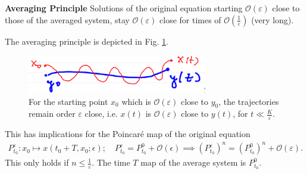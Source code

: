 \begin{framed}
	\noindent
	\textbf{Averaging Principle} Solutions of the original equation starting $\mathcal{O}(\varepsilon)$ close to those of the averaged system, stay $\mathcal{O}(\varepsilon)$ close for times of $\mathcal{O}\left(\frac{1}{\varepsilon}\right)$ (very long).
\end{framed}

The averaging principle is depicted in Fig. \ref{fig:avg_principle}.
\begin{figure}[h!]
	\centering
	\includegraphics[width=0.7\textwidth]{figures/ch5/3avg_principle.png}
	\caption{For the starting point $x_0$ which is $\mathcal{O}(\varepsilon)$ close to $y_0$, the trajectories remain order $\varepsilon$ close, i.e. $x(t)$ is $\mathcal{O}(\varepsilon)$ close to $y(t)$, for $t \ll \frac{K}{\varepsilon}$.}
	\label{fig:avg_principle}
\end{figure}

This has implications for the Poincaré map of the original equation
\begin{align}
	P_{t_0}^{\varepsilon}:x_0 \mapsto x(t_0+T, x_0; \epsilon);\quad P_{t_0}^{\varepsilon} = P_{t_0}^{0} + \mathcal{O}(\epsilon) \implies \left( P_{t_0}^{\varepsilon}\right)^{n} = \left( P_{t_0}^{0}\right)^{n} + \mathcal{O}(\varepsilon).
\end{align}
This only holds if $n \leq \frac{1}{\varepsilon}$. The time $T$ map of the average system is $P_{t_0}^{0}$.

